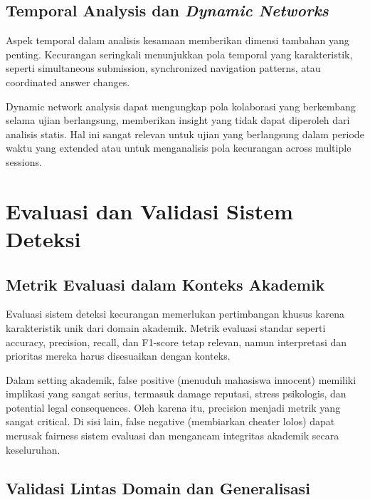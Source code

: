 \subsection{Temporal Analysis dan \textit{Dynamic Networks}}

Aspek temporal dalam analisis kesamaan memberikan dimensi tambahan yang penting. Kecurangan seringkali menunjukkan pola temporal yang karakteristik, seperti simultaneous submission, synchronized navigation patterns, atau coordinated answer changes.

Dynamic network analysis dapat mengungkap pola kolaborasi yang berkembang selama ujian berlangsung, memberikan insight yang tidak dapat diperoleh dari analisis statis. Hal ini sangat relevan untuk ujian yang berlangsung dalam periode waktu yang extended atau untuk menganalisis pola kecurangan across multiple sessions.

\section{Evaluasi dan Validasi Sistem Deteksi}
\label{sec:evaluationValidation}

\subsection{Metrik Evaluasi dalam Konteks Akademik}

Evaluasi sistem deteksi kecurangan memerlukan pertimbangan khusus karena karakteristik unik dari domain akademik. Metrik evaluasi standar seperti accuracy, precision, recall, dan F1-score tetap relevan, namun interpretasi dan prioritas mereka harus disesuaikan dengan konteks.

Dalam setting akademik, false positive (menuduh mahasiswa innocent) memiliki implikasi yang sangat serius, termasuk damage reputasi, stress psikologis, dan potential legal consequences. Oleh karena itu, precision menjadi metrik yang sangat critical. Di sisi lain, false negative (membiarkan cheater lolos) dapat merusak fairness sistem evaluasi dan mengancam integritas akademik secara keseluruhan.

\subsection{Validasi Lintas Domain dan Generalisasi}

